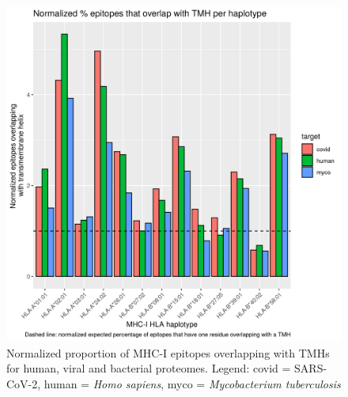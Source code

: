\begin{figure}[!htbp]
  \includegraphics[width=\textwidth]{bbbq_1_smart_results/fig_f_tmh_mhc1_2_normalized.png}
  \caption{
    Normalized proportion of MHC-I epitopes overlapping with TMHs
    for human, viral and bacterial proteomes.
    Legend: covid = SARS-CoV-2,
    human = \emph{Homo sapiens}, 
    myco = \emph{Mycobacterium tuberculosis}
  }
  \label{fig:f_tmh_mhc1_normalized}
\end{figure}

